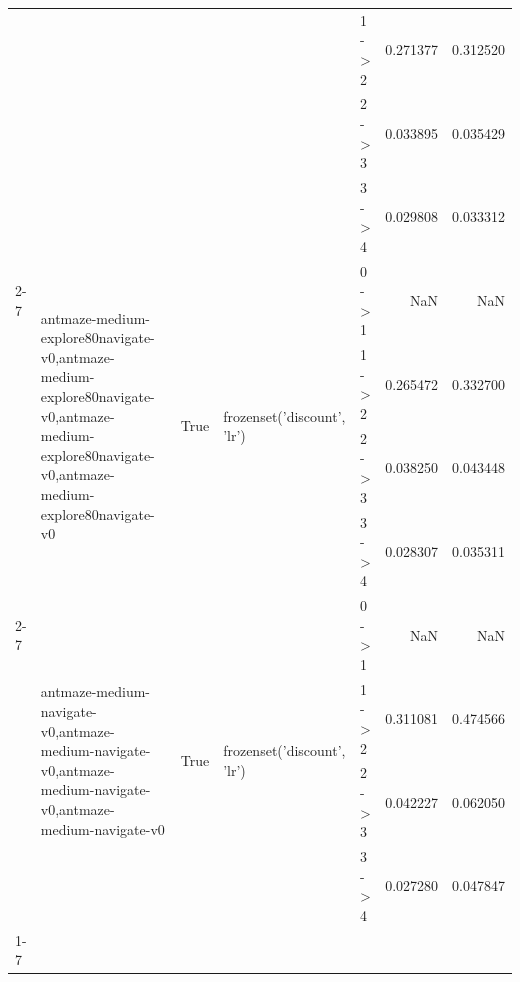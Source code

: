 \begin{tabular}{lllllrr}
 &  &  &  & 1 -> 2 & 0.271377 & 0.312520 \\
 &  &  &  & 2 -> 3 & 0.033895 & 0.035429 \\
 &  &  &  & 3 -> 4 & 0.029808 & 0.033312 \\
\cline{2-7} \cline{3-7} \cline{4-7}
 & \multirow[t]{4}{*}{antmaze-medium-explore80navigate-v0,antmaze-medium-explore80navigate-v0,antmaze-medium-explore80navigate-v0,antmaze-medium-explore80navigate-v0} & \multirow[t]{4}{*}{True} & \multirow[t]{4}{*}{frozenset({'discount', 'lr'})} & 0 -> 1 & NaN & NaN \\
 &  &  &  & 1 -> 2 & 0.265472 & 0.332700 \\
 &  &  &  & 2 -> 3 & 0.038250 & 0.043448 \\
 &  &  &  & 3 -> 4 & 0.028307 & 0.035311 \\
\cline{2-7} \cline{3-7} \cline{4-7}
 & \multirow[t]{4}{*}{antmaze-medium-navigate-v0,antmaze-medium-navigate-v0,antmaze-medium-navigate-v0,antmaze-medium-navigate-v0} & \multirow[t]{4}{*}{True} & \multirow[t]{4}{*}{frozenset({'discount', 'lr'})} & 0 -> 1 & NaN & NaN \\
 &  &  &  & 1 -> 2 & 0.311081 & 0.474566 \\
 &  &  &  & 2 -> 3 & 0.042227 & 0.062050 \\
 &  &  &  & 3 -> 4 & 0.027280 & 0.047847 \\
\cline{1-7} \cline{2-7} \cline{3-7} \cline{4-7}
\bottomrule
\end{tabular}
